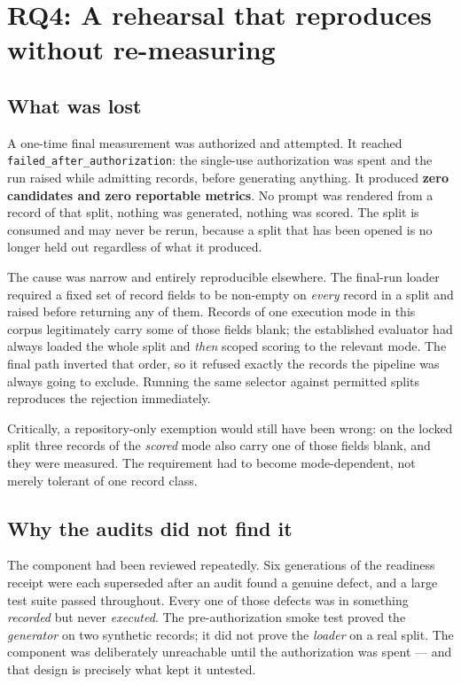 \documentclass[10pt,conference]{IEEEtran}
\begin{document}
\section{RQ4: A rehearsal that reproduces without re-measuring}
\label{sec:rq4}

\subsection{What was lost}

A one-time final measurement was authorized and attempted. It reached
\texttt{failed\_after\_authorization}: the single-use authorization was spent
and the run raised while admitting records, before generating anything. It
produced \textbf{zero candidates and zero reportable metrics}. No prompt was
rendered from a record of that split, nothing was generated, nothing was scored.
The split is consumed and may never be rerun, because a split that has been
opened is no longer held out regardless of what it produced.

The cause was narrow and entirely reproducible elsewhere. The final-run loader
required a fixed set of record fields to be non-empty on \emph{every} record in
a split and raised before returning any of them. Records of one execution mode
in this corpus legitimately carry some of those fields blank; the established
evaluator had always loaded the whole split and \emph{then} scoped scoring to
the relevant mode. The final path inverted that order, so it refused exactly the
records the pipeline was always going to exclude. Running the same selector
against permitted splits reproduces the rejection immediately.

Critically, a repository-only exemption would still have been wrong: on the
locked split three records of the \emph{scored} mode also carry one of those
fields blank, and they were measured. The requirement had to become
mode-dependent, not merely tolerant of one record class.

\subsection{Why the audits did not find it}

The component had been reviewed repeatedly. Six generations of the readiness
receipt were each superseded after an audit found a genuine defect, and a large
test suite passed throughout. Every one of those defects was in something
\emph{recorded} but never \emph{executed}. The pre-authorization smoke test
proved the \emph{generator} on two synthetic records; it did not prove the
\emph{loader} on a real split. The component was deliberately unreachable until
the authorization was spent --- and that design is precisely what kept it
untested.
\end{document}
